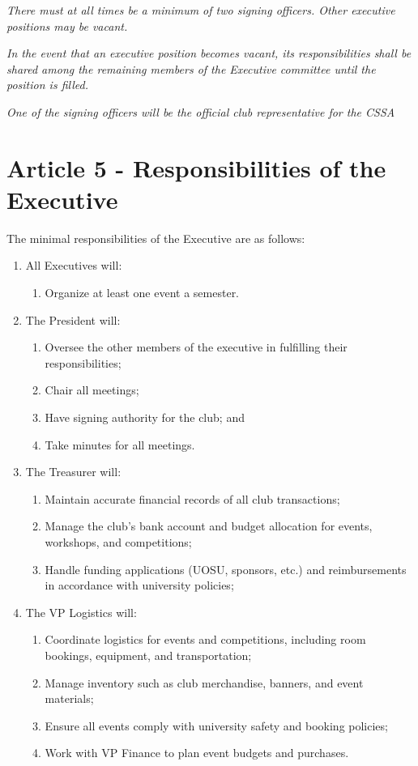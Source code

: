 \textit{There must at all times be a minimum of two signing officers. Other executive positions may be vacant.}

\textit{In the event that an executive position becomes vacant, its responsibilities shall be shared among the remaining members of the Executive committee until the position is filled.}

\textit{One of the signing officers will be the official club representative for the CSSA}

\section*{Article 5 - Responsibilities of the Executive}

The minimal responsibilities of the Executive are as follows:
\begin{enumerate}
    \item All Executives will:
    \begin{enumerate}
      \item Organize at least one event a semester.
    \end{enumerate}

    \item The President will:
    \begin{enumerate}
        \item Oversee the other members of the executive in fulfilling their
              responsibilities;
        \item Chair all meetings;
        \item Have signing authority for the club; and
        \item Take minutes for all meetings.
    \end{enumerate}

    \item The Treasurer will:  %
    \begin{enumerate}
      \item Maintain accurate financial records of all club transactions;
      \item Manage the club’s bank account and budget allocation for events, workshops, and competitions;
      \item Handle funding applications (UOSU, sponsors, etc.) and reimbursements in accordance with university policies;
    \end{enumerate}


    \item The VP Logistics will:  %
    \begin{enumerate}
      \item Coordinate logistics for events and competitions, including room bookings, equipment, and transportation;
      \item Manage inventory such as club merchandise, banners, and event materials;
      \item Ensure all events comply with university safety and booking policies;
      \item Work with VP Finance to plan event budgets and purchases.
    \end{enumerate}


\end{enumerate}
